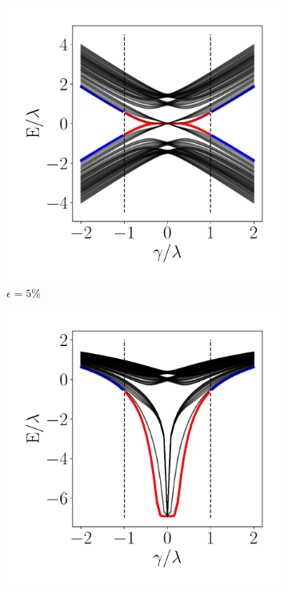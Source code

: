 \begin{figure}[tbh!]
     \begin{minipage}[h!]{0.9\textwidth}
         \begin{subfigure}[b!]{0.3 \textwidth}
            \caption{$\epsilon = 5\%$}             \includegraphics[width=\textwidth]{Imagenes/Resultados_Hoti_Fractal/bands_square_shh_0.1.pdf}
         \end{subfigure}\hspace*{-0.5em}
         \begin{subfigure}[b!]{0.3 \textwidth}
            \caption*{}
            \includegraphics[width=\textwidth]{Imagenes/Resultados_Hoti_Fractal/bands_square_shh_log0.1.pdf}

\end{subfigure}
\end{minipage}
\end{figure}
